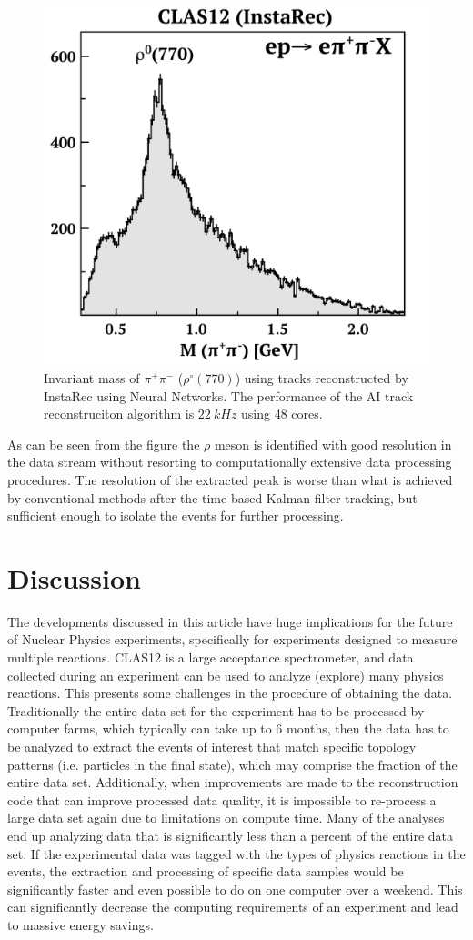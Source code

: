 \documentclass[preprint,12pt]{elsarticle}
\begin{document}
\begin{figure}[h!]
\centering
\includegraphics[width=0.5\columnwidth]{images/rho_meson_instarec.pdf}
\caption{Invariant mass of $\pi^+\pi^-$ ($\rho^\circ(770)$) using tracks reconstructed by InstaRec using Neural Networks. The performance of the AI track reconstruciton algorithm is $22~kHz$ using 48 cores.} 
\label{fig:rho}
\end{figure}

As can be seen from the figure the $\rho$ meson is identified with good resolution in the data stream without resorting to computationally extensive data processing procedures. The resolution of the extracted peak is worse than what is achieved by conventional methods after the time-based Kalman-filter tracking, but sufficient enough to isolate the events for further processing. 

\section{Discussion}

The developments discussed in this article have huge implications for the future of Nuclear Physics experiments, specifically for experiments designed to measure multiple reactions. 
CLAS12 is a large acceptance spectrometer, and data collected during an experiment can be used to analyze (explore) many physics reactions. This presents some challenges in the procedure of obtaining the data. Traditionally the entire data set for the experiment has to be processed by computer farms, which typically can take up to 6 months, then the data has to be analyzed to extract the events of interest that match specific topology patterns (i.e. particles in the final state), which may comprise the fraction of the entire data set. Additionally, when improvements are made to the reconstruction code that can improve processed data quality, it is impossible to re-process a large data set again due to limitations on compute time. Many of the analyses end up analyzing data that is significantly less than a percent of the entire data set. If the experimental data was tagged with the types of physics reactions in the events, the extraction and processing of specific data samples would be significantly faster and even possible to do on one computer over a weekend. This can significantly decrease the computing requirements of an experiment and lead to massive energy savings.
\end{document}
